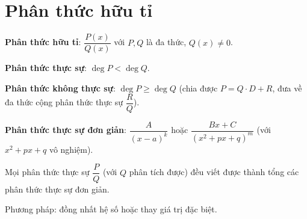 \documentclass[12pt,a4paper]{article}
\begin{document}

\section{Phân thức hữu tỉ}

\begin{dinhnghia}
  \textbf{Phân thức hữu tỉ}: $\dfrac{P(x)}{Q(x)}$ với $P, Q$ là đa thức, $Q(x) \ne 0$.
  
  \textbf{Phân thức thực sự}: $\deg P < \deg Q$.
  
  \textbf{Phân thức không thực sự}: $\deg P \ge \deg Q$ (chia được $P = Q \cdot D + R$, đưa về đa thức cộng phân thức thực sự $\dfrac{R}{Q}$).
\end{dinhnghia}

\begin{dinhnghia}
  \textbf{Phân thức thực sự đơn giản}: $\dfrac{A}{(x - a)^k}$ hoặc $\dfrac{Bx + C}{(x^2 + px + q)^m}$ (với $x^2 + px + q$ vô nghiệm).
\end{dinhnghia}

\begin{dinhly}[title={Phân tích thành tổng phân thức đơn giản}]
  Mọi phân thức thực sự $\dfrac{P}{Q}$ (với $Q$ phân tích được) đều viết được thành tổng các phân thức thực sự đơn giản.
  
  Phương pháp: đồng nhất hệ số hoặc thay giá trị đặc biệt.
\end{dinhly}
\end{document}
